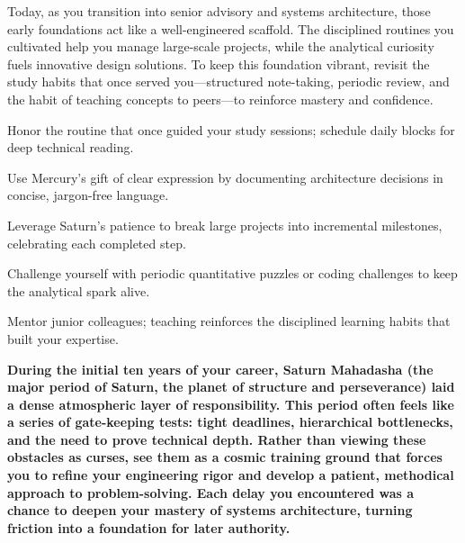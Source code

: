 {\fontsize{9}{13}\selectfont Today, as you transition into senior advisory and systems architecture, those early foundations act like a well-engineered scaffold. The disciplined routines you cultivated help you manage large-scale projects, while the analytical curiosity fuels innovative design solutions. To keep this foundation vibrant, revisit the study habits that once served you---structured note-taking, periodic review, and the habit of teaching concepts to peers---to reinforce mastery and confidence.}\par\vspace{1.8mm}

\begin{diamondlist}
  \item {\fontsize{8.5}{12}\selectfont Honor the routine that once guided your study sessions; schedule daily blocks for deep technical reading.}
  \item {\fontsize{8.5}{12}\selectfont Use Mercury's gift of clear expression by documenting architecture decisions in concise, jargon-free language.}
  \item {\fontsize{8.5}{12}\selectfont Leverage Saturn's patience to break large projects into incremental milestones, celebrating each completed step.}
  \item {\fontsize{8.5}{12}\selectfont Challenge yourself with periodic quantitative puzzles or coding challenges to keep the analytical spark alive.}
  \item {\fontsize{8.5}{12}\selectfont Mentor junior colleagues; teaching reinforces the disciplined learning habits that built your expertise.}
\end{diamondlist}


\label{topic38}

{\fontsize{9.5}{13.8}\selectfont\bfseries\color{DeepSlate} During the initial ten years of your career, Saturn Mahadasha (the major period of Saturn, the planet of structure and perseverance) laid a dense atmospheric layer of responsibility. This period often feels like a series of gate-keeping tests: tight deadlines, hierarchical bottlenecks, and the need to prove technical depth. Rather than viewing these obstacles as curses, see them as a cosmic training ground that forces you to refine your engineering rigor and develop a patient, methodical approach to problem-solving. Each delay you encountered was a chance to deepen your mastery of systems architecture, turning friction into a foundation for later authority.}\par\vspace{2mm}

